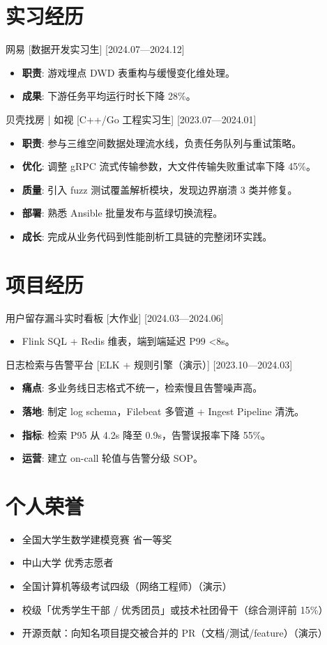 \documentclass{resume-photo}
\begin{document}
\section{实习经历}
\ResumeItem
{网易}
[\textnormal{数据开发实习生}]
[2024.07—2024.12]

\begin{itemize}
  \item \textbf{职责}: 游戏埋点 DWD 表重构与缓慢变化维处理。
  \item \textbf{成果}: 下游任务平均运行时长下降 28\%。
\end{itemize}


\ResumeItem
{贝壳找房 | 如视}
[\textnormal{C++/Go 工程实习生}]
[2023.07—2024.01]

\begin{itemize}
  \item \textbf{职责}: 参与三维空间数据处理流水线，负责任务队列与重试策略。
  \item \textbf{优化}: 调整 gRPC 流式传输参数，大文件传输失败重试率下降 45\%。
  \item \textbf{质量}: 引入 fuzz 测试覆盖解析模块，发现边界崩溃 3 类并修复。
  \item \textbf{部署}: 熟悉 Ansible 批量发布与蓝绿切换流程。
  \item \textbf{成长}: 完成从业务代码到性能剖析工具链的完整闭环实践。
\end{itemize}



\section{项目经历}
\ResumeItem
{用户留存漏斗实时看板}
[\textnormal{大作业}]
[2024.03—2024.06]

\begin{itemize}
  \item Flink SQL + Redis 维表，端到端延迟 P99 <8s。
\end{itemize}


\ResumeItem
{日志检索与告警平台}
[\textnormal{ELK + 规则引擎（演示）}]
[2023.10—2024.03]

\begin{itemize}
  \item \textbf{痛点}: 多业务线日志格式不统一，检索慢且告警噪声高。
  \item \textbf{落地}: 制定 log schema，Filebeat 多管道 + Ingest Pipeline 清洗。
  \item \textbf{指标}: 检索 P95 从 4.2s 降至 0.9s，告警误报率下降 55\%。
  \item \textbf{运营}: 建立 on-call 轮值与告警分级 SOP。
\end{itemize}



\section{个人荣誉}
\begin{itemize}
  \item 全国大学生数学建模竞赛 省一等奖
  \item 中山大学 优秀志愿者
  \item 全国计算机等级考试四级（网络工程师）（演示）
  \item 校级「优秀学生干部 / 优秀团员」或技术社团骨干（综合测评前 15\%）
  \item 开源贡献：向知名项目提交被合并的 PR（文档/测试/feature）（演示）
\end{itemize}
\end{document}
